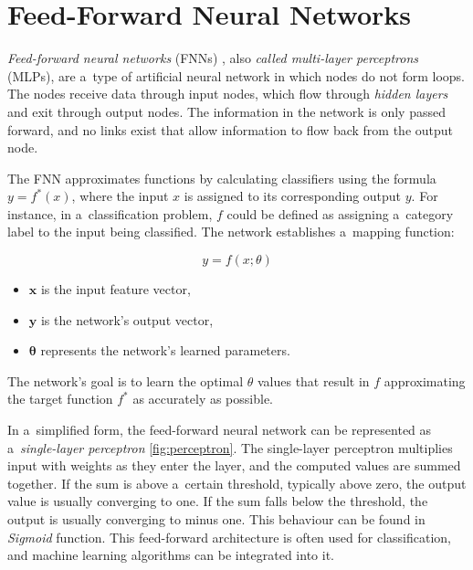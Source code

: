 \section{Feed-Forward Neural Networks}

\textit{Feed-forward neural networks} (FNNs) \cite{Goodfellow-et-al-2016, aggarwal2018neural, Haykin2004}, also \textit{called multi-layer perceptrons} (MLPs), are a~type of artificial neural network in which nodes do not form loops. The nodes receive data through input nodes, which flow through \textit{hidden layers} and exit through output nodes. The information in the network is only passed forward, and no links exist that allow information to flow back from the output node. 

The FNN approximates functions by calculating classifiers using the formula $y = f^*(x)$, where the input $x$ is assigned to its corresponding output $y$. For instance, in a~classification problem, $f$ could be defined as assigning a~category label to the input being classified. The network establishes a~mapping function:

\begin{equation}\label{mapping}
y = f(x; \theta)
\end{equation}

\begin{itemize}
    \item $\mathbf{x}$ is the input feature vector,
    \item $\mathbf{y}$ is the network's output vector,
    \item $\mathbf{\theta}$ represents the network's learned parameters.
\end{itemize}

The network's goal is to learn the optimal $\theta$ values that result in $f$ approximating the target function $f^*$ as accurately as possible. 

\newpage

In a~simplified form, the feed-forward neural network can be represented as a~\textit{single-layer perceptron} \ref{fig:perceptron}. The single-layer perceptron multiplies input with weights as they enter the layer, and the computed values are summed together. If the sum is above a~certain threshold, typically above zero, the output value is usually converging to one. If the sum falls below the threshold, the output is usually converging to minus one. This behaviour can be found in \textit{Sigmoid} function. This feed-forward architecture is often used for classification, and machine learning algorithms can be integrated into it. 

